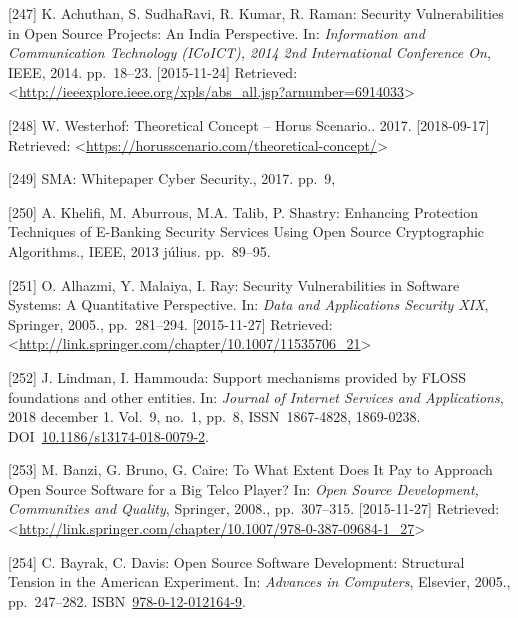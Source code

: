 \documentclass[12pt,magyar,a4paper,oneside]{scrreprt}
\begin{document}
\leavevmode\hypertarget{ref-achuthan_security_2014}{}%
{[}247{]} K. Achuthan, S. SudhaRavi, R. Kumar, R. Raman: Security
Vulnerabilities in Open Source Projects: An India Perspective. In:
\emph{Information and Communication Technology (ICoICT), 2014 2nd
International Conference On}, IEEE, 2014. pp.~18--23. {[}2015-11-24{]}
Retrieved:
\textless{}\url{http://ieeexplore.ieee.org/xpls/abs_all.jsp?arnumber=6914033}\textgreater{}

\leavevmode\hypertarget{ref-westerhof_theoretical_2017}{}%
{[}248{]} W. Westerhof: Theoretical Concept -- Horus Scenario.. 2017.
{[}2018-09-17{]} Retrieved:
\textless{}\url{https://horusscenario.com/theoretical-concept/}\textgreater{}

\leavevmode\hypertarget{ref-sma_whitepaper_2017}{}%
{[}249{]} SMA: Whitepaper Cyber Security., 2017. pp.~9,

\leavevmode\hypertarget{ref-khelifi_enhancing_2013}{}%
{[}250{]} A. Khelifi, M. Aburrous, M.A. Talib, P. Shastry: Enhancing
Protection Techniques of E-Banking Security Services Using Open Source
Cryptographic Algorithms., IEEE, 2013 július. pp.~89--95.

\leavevmode\hypertarget{ref-alhazmi_security_2005}{}%
{[}251{]} O. Alhazmi, Y. Malaiya, I. Ray: Security Vulnerabilities in
Software Systems: A Quantitative Perspective. In: \emph{Data and
Applications Security XIX}, Springer, 2005., pp.~281--294.
{[}2015-11-27{]} Retrieved:
\textless{}\url{http://link.springer.com/chapter/10.1007/11535706_21}\textgreater{}

\leavevmode\hypertarget{ref-lindman_support_2018}{}%
{[}252{]} J. Lindman, I. Hammouda: Support mechanisms provided by FLOSS
foundations and other entities. In: \emph{Journal of Internet Services
and Applications}, 2018 december 1. Vol.~9, no.~1, pp.~8,
ISSN~1867-4828, 1869-0238.
DOI~\href{https://doi.org/10.1186/s13174-018-0079-2}{10.1186/s13174-018-0079-2}.

\leavevmode\hypertarget{ref-banzi_what_2008}{}%
{[}253{]} M. Banzi, G. Bruno, G. Caire: To What Extent Does It Pay to
Approach Open Source Software for a Big Telco Player? In: \emph{Open
Source Development, Communities and Quality}, Springer, 2008.,
pp.~307--315. {[}2015-11-27{]} Retrieved:
\textless{}\url{http://link.springer.com/chapter/10.1007/978-0-387-09684-1_27}\textgreater{}

\leavevmode\hypertarget{ref-bayrak_open_2005}{}%
{[}254{]} C. Bayrak, C. Davis: Open Source Software Development:
Structural Tension in the American Experiment. In: \emph{Advances in
Computers}, Elsevier, 2005., pp.~247--282.
ISBN~\href{https://worldcat.org/isbn/978-0-12-012164-9}{978-0-12-012164-9}.
\end{document}
